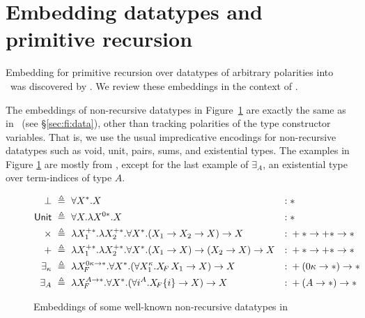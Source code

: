 \section{Embedding datatypes and primitive recursion}
\label{sec:fixi:data}
Embedding for primitive recursion over datatypes of arbitrary polarities into
\Fixi\ was discovered by \citet{AbeMat04}. We review these embeddings
in the context of \Fixi.

The embeddings of non-recursive datatypes in Figure~\ref{fig:fixiNonRecData}
are exactly the same as in \Fi\ (see \S\ref{sec:fi:data}), other than tracking
polarities of the type constructor variables. That is, we use the usual
impredicative encodings for non-recursive datatypes such as void, unit, pairs,
sums, and existential types. The examples in Figure \ref{fig:fixiNonRecData}
are mostly from \citet{AbeMat04}, except for the last example of $\exists_A$,
an existential type over term-indices of type $A$.
\begin{figure}
\begin{singlespace}
\begin{align*}
\bot &~\triangleq~ \forall X^{*}.X
	&:\;& *\\
\textsf{Unit} &~\triangleq~ \forall X.\lambda X^{0*}. X
	&:\;& * \\
\times &~\triangleq~
	\lambda X_1^{+*}.\lambda X_2^{+*}.\forall X^{*}.(X_1 -> X_2 -> X) -> X
	&:\;& +* -> +* -> * \\
+ &~\triangleq~
	\lambda X_1^{+*}.\lambda X_2^{+*}.\forall X^{*}.(X_1 -> X) -> (X_2 -> X) -> X
	&:\;& +* -> +* -> * \\
\exists_\kappa &~\triangleq~
	\lambda X_{\!F}^{0\kappa -> *}.\forall X^{*}.
		(\forall X_1^\kappa.X_{\!F}\,X_1 -> X) -> X
	&:\;& +(0\kappa -> *) -> * \\
\exists_A &~\triangleq~
	\lambda X_{\!F}^{A -> *}.\forall X^{*}.
	(\forall i^A.X_{\!F}\{i\} -> X) -> X
	&:\;& +(A -> *) -> *
\end{align*}
\caption{Embeddings of some well-known non-recursive datatypes in \Fixi}
\label{fig:fixiNonRecData}
\end{singlespace}
\end{figure}

